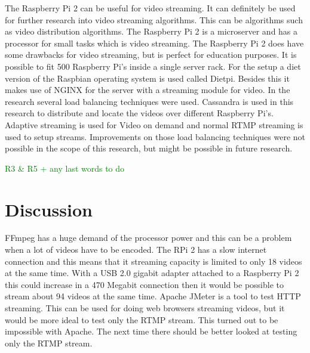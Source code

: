 \documentclass{sig-alternate-br}
\newcommand\todo[1]{
	\textcolor{green}{#1}
}
\begin{document}
The Raspberry Pi 2 can be useful for video streaming. It can definitely be used for further research into video streaming algorithms. This can be algorithms such as video distribution algorithms. The Raspberry Pi 2 is a microserver and has a processor for small tasks which is video streaming. The Raspberry Pi 2 does have some drawbacks for video streaming, but is perfect for education purposes. \newline
It is possible to fit 500 Raspberry Pi's inside a single server rack. \newline
For the setup a diet version of the Raspbian operating system is used called Dietpi. Besides this it makes use of NGINX for the server with a streaming module for video. \newline
In the research several load balancing techniques were used. Cassandra is used in this research to distribute and locate the videos over different Raspberry Pi's. Adaptive streaming is used for Video on demand and normal RTMP streaming is used to setup streams. Improvements on those load balancing techniques were not possible in the scope of this research, but might be possible in future research. 
\todo{R3 \& R5 + any last words	 to do}

\section{Discussion}

 FFmpeg has a huge demand of the processor power and this can be a problem when a lot of videos have to be encoded. \newline
 The RPi 2 has a slow internet connection and this means that it streaming capacity is limited to only 18 videos at the same time. With a USB 2.0 gigabit adapter attached to a Raspberry Pi 2 this could increase in a 470 Megabit connection then it would be possible to stream about 94 videos at the same time. \newline
 Apache JMeter is a tool to test HTTP streaming. This can be used for doing web browsers streaming videos, but it would be more ideal to test only the RTMP stream. This turned out to be impossible with Apache. The next time there should be better looked at testing only the RTMP stream. 
 
\end{document}
